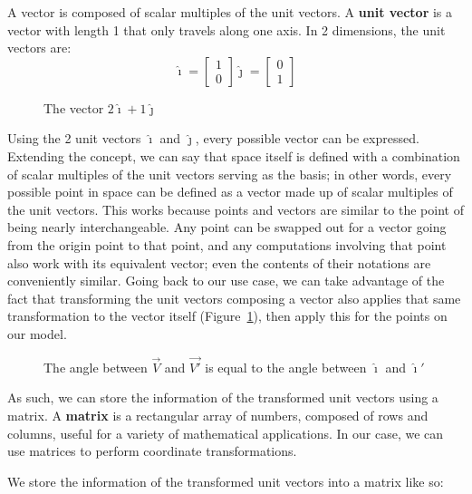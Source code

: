 \documentclass[a4paper]{article}
\newcommand*{\ihat}{\hat{\imath}}
\newcommand*{\jhat}{\hat{\jmath}}
\begin{document}
A vector is composed of scalar multiples of the unit vectors. A \textbf{unit vector} is a vector with length 1 that only travels along one axis. In 2 dimensions, the unit vectors are:
\[
\ihat = 
\begin{bmatrix}
    1 \\
    0
\end{bmatrix}
\jhat = 
\begin{bmatrix}
    0 \\
    1
\end{bmatrix}
\]
\begin{figure}[htp]
    \centering
    \caption{The vector $2\ihat + 1\jhat$}
\end{figure}
Using the 2 unit vectors $\ihat$ and $\jhat$, every possible vector can be expressed. Extending the concept, we can say that space itself is defined with a combination of scalar multiples of the unit vectors serving as the basis; in other words, every possible point in space can be defined as a vector made up of scalar multiples of the unit vectors. This works because points and vectors are similar to the point of being nearly interchangeable. Any point can be swapped out for a vector going from the origin point to that point, and any computations involving that point also work with its equivalent vector; even the contents of their notations are conveniently similar. Going back to our use case, we can take advantage of the fact that transforming the unit vectors composing a vector also applies that same transformation to the vector itself (Figure~\ref{figure:vectorTransformation}), then apply this for the points on our model.

\begin{figure}[htp]
    \centering
    \caption{The angle between $\vec{V}$ and $\vec{V\prime}$ is equal to the angle between $\ihat$ and $\ihat\prime$}\label{figure:vectorTransformation}
\end{figure}

As such, we can store the information of the transformed unit vectors using a matrix. A \textbf{matrix} is a rectangular array of numbers, composed of rows and columns, useful for a variety of mathematical applications. In our case, we can use matrices to perform coordinate transformations.

We store the information of the transformed unit vectors into a matrix like so:
\end{document}
